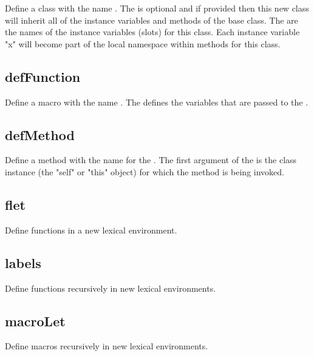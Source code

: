 \begin{itemize}
  Define a class with the name . 
  The  is optional and if provided then this new class
  will inherit all of the instance variables and methods of the base class.
  The  are the names of the instance variables (slots) for this class. Each instance variable "x" will become part of the local namespace within methods for this class.

\subsection{defFunction}

  Define a macro with the name .
  The  defines the variables that are
  passed to the .

\subsection{defMethod}

  Define a method with the name  for the .
  The first argument of the  is the class 
  instance (the "self" or "this" object)  for which the method is being invoked.

\subsection{flet}

  Define functions in a new lexical environment.

\subsection{labels}

  Define functions recursively in new lexical environments.

\subsection{macroLet}

  Define macros recursively in new lexical environments.


\end{itemize}
